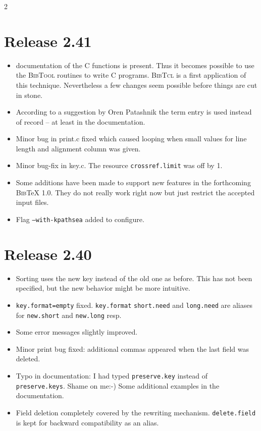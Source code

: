 \documentclass[11pt,a4paper]{scrartcl}
\newcommand\rsc[1]{\texttt{#1}}
\newcommand\File[1]{\textsf{#1}}
\newcommand\BibTool{\textsc{BibTool}}
\newcommand\BibTcl{\textsc{BibTcl}}
\newcommand\BibTeX{\textsc{Bib}\TeX}
\newenvironment{Releases}{\begin{multicols}2\RaggedRight}{\end{multicols}}
\newenvironment{Release}[2]{%
  \def\tmp{#2}%
  \section*{Release #1 \ifx\tmp\empty\else{\normalsize[#2]}\fi}
  \begin{itemize}
}{\end{itemize}}
\newenvironment{Fix}[1]{\item }{}
\newenvironment{New}[1]{\item }{}
\newenvironment{Doc}[1]{\item }{}
\newenvironment{Update}[1]{\item }{}
\begin{document}
\begin{Releases}
\begin{Release}{2.41}{}
\begin{Doc}{gene}
    documentation of the C functions is present. Thus it becomes possible to
    use the \BibTool{} routines to write C programs. \BibTcl{} is a first
    application of this technique. Nevertheless a few changes seem possible
    before things are cut in stone.
  \end{Doc}
  \begin{Doc}{gene}
    According to a suggestion by Oren Patashnik the term entry is used instead
    of record -- at least in the documentation.
  \end{Doc}
  \begin{Fix}{gene}
    Minor bug in \File{print.c} fixed which caused looping when small values
    for line length and alignment column was given.
  \end{Fix}
  \begin{Fix}{gene}
    Minor bug-fix in \File{key.c}. The resource \rsc{crossref.limit} was
    off by 1.
  \end{Fix}
  \begin{New}{gene}
    Some additions have been made to support new features in the forthcoming
    \BibTeX{} 1.0. They do not really work right now but just restrict the
    accepted input files.
  \end{New}
  \begin{New}{gene}
    Flag \texttt{--with-kpathsea} added to configure.
  \end{New}
 \end{Release}

 \begin{Release}{2.40}{}
  \begin{New}{gene}
    Sorting uses the new key instead of the old one as before. This has not
    been specified, but the new behavior might be more intuitive.
  \end{New}
  \begin{Fix}{gene}
    \rsc{key.format=empty} fixed. \rsc{key.format} \rsc{short.need}
    and \rsc{long.need} are aliases for \rsc{new.short} and
    \rsc{new.long} resp.
  \end{Fix}
  \begin{Update}{gene}
    Some error messages slightly improved.
  \end{Update}
  \begin{Fix}{gene}
    Minor print bug fixed: additional commas appeared when the last field was
    deleted.
  \end{Fix}
  \begin{Doc}{gene}
    Typo in documentation: I had typed \rsc{preserve.key} instead of
    \rsc{preserve.keys}. Shame on me:-) Some additional examples in the
    documentation.
  \end{Doc}
  \begin{Update}{gene}
    Field deletion completely covered by the rewriting mechanism.
    \rsc{delete.field} is kept for backward compatibility as an alias.
  \end{Update}
 \end{Release}


\end{Releases}
\end{document}
